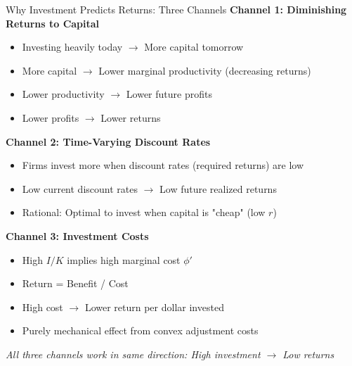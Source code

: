 \documentclass{beamer}
\begin{document}
\begin{frame}{Why Investment Predicts Returns: Three Channels}
    \textbf{Channel 1: Diminishing Returns to Capital}
    \begin{itemize}
        \item Investing heavily today $\rightarrow$ More capital tomorrow
        \item More capital $\rightarrow$ Lower marginal productivity (decreasing returns)
        \item Lower productivity $\rightarrow$ Lower future profits
        \item Lower profits $\rightarrow$ Lower returns
    \end{itemize}
    
    \vspace{0.2cm}
    \textbf{Channel 2: Time-Varying Discount Rates}
    \begin{itemize}
        \item Firms invest more when discount rates (required returns) are low
        \item Low current discount rates $\rightarrow$ Low future realized returns
        \item Rational: Optimal to invest when capital is "cheap" (low $r$)
    \end{itemize}
    
    \vspace{0.2cm}
    \textbf{Channel 3: Investment Costs}
    \begin{itemize}
        \item High $I/K$ implies high marginal cost $\phi'$
        \item Return = Benefit / Cost
        \item High cost $\rightarrow$ Lower return per dollar invested
        \item Purely mechanical effect from convex adjustment costs
    \end{itemize}
    
    \vspace{0.2cm}
    \textit{All three channels work in same direction: High investment $\rightarrow$ Low returns}
\end{frame}
\end{document}
